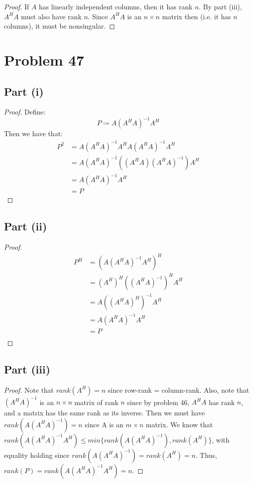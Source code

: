 \documentclass{article}
\begin{document}
\begin{proof}
If $A$ has linearly independent columns, then it has rank $n$. By part (iii), $A^{H}A$ must also have rank $n$. Since $A^{H}A$ is an $n \times n$ matrix then (i.e. it has $n$ columns), it must be nonsingular.
\end{proof}


\section*{Problem 47}

\subsection*{Part (i)}

\begin{proof}
Define:
$$P \coloneqq A(A^{H}A)^{-1}A^{H}$$
Then we have that:
\begin{align*}
P^{2} &=  A(A^{H}A)^{-1}A^{H}A(A^{H}A)^{-1}A^{H} \\
&= A(A^{H}A)^{-1}((A^{H}A)(A^{H}A)^{-1})A^{H} \\
&= A(A^{H}A)^{-1}A^{H} \\
&= P
\end{align*}
\end{proof}

\subsection*{Part (ii)}

\begin{proof}
\begin{align*}
P^{H} &=  (A(A^{H}A)^{-1}A^{H})^{H} \\
&= (A^{H})^{H}((A^{H}A)^{-1})^{H}A^{H} \\
&=  A((A^{H}A)^{H})^{-1}A^{H} \\
&= A(A^{H}A)^{-1}A^{H} \\
&= P \\
\end{align*}
\end{proof}

\subsection*{Part (iii)}

\begin{proof}
Note that $rank(A^{H}) = n$ since row-rank = column-rank. Also, note that $(A^{H}A)^{-1}$ is an $n \times n$ matrix of rank $n$ since by problem 46, $A^{H}A$ has rank $n$, and a matrix has the same rank as its inverse. Then we must have $rank(A(A^{H}A)^{-1}) = n$ since A is an $m \times n$ matrix. We know that $rank(A(A^{H}A)^{-1}A^{H}) \leq min\{rank(A(A^{H}A)^{-1}), rank(A^{H})\}$, with equality holding since $rank(A(A^{H}A)^{-1}) = rank(A^{H}) = n$. Thus, $rank(P) = rank(A(A^{H}A)^{-1}A^{H}) = n$.
\end{proof}
\end{document}
